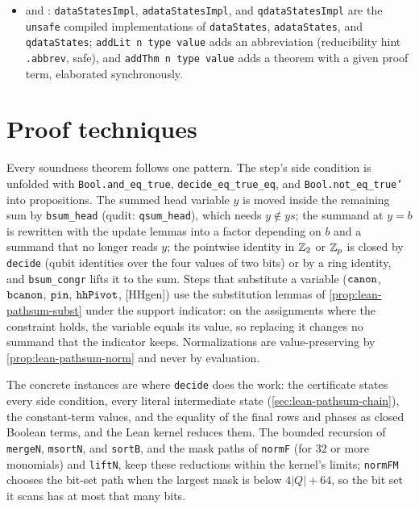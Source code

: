 \begin{itemize}
\item {} and : \textnormal{\texttt{dataStatesImpl}},
  \textnormal{\texttt{adataStatesImpl}}, and \textnormal{\texttt{qdataStatesImpl}} are the \textnormal{\texttt{unsafe}} compiled implementations of
  \textnormal{\texttt{dataStates}}, \textnormal{\texttt{adataStates}}, and \textnormal{\texttt{qdataStates}}; \textnormal{\texttt{addLit n type value}} adds an
  abbreviation (reducibility hint \textnormal{\texttt{.\allowbreak{}abbrev}}, safe), and \textnormal{\texttt{addThm n type value}} adds a
  theorem with a given proof term, elaborated synchronously.
\end{itemize}

\section{Proof techniques}\label{sec:lean-pathsum-proofs}

Every soundness theorem follows one pattern. The step's side condition is unfolded with
\textnormal{\texttt{Bool.\allowbreak{}and\_\allowbreak{}eq\_\allowbreak{}true}}, \textnormal{\texttt{decide\_\allowbreak{}eq\_\allowbreak{}true\_\allowbreak{}eq}}, and \textnormal{\texttt{Bool.\allowbreak{}not\_\allowbreak{}eq\_\allowbreak{}true'}} into propositions.
The summed head variable $y$ is moved inside the remaining sum by \textnormal{\texttt{bsum\_\allowbreak{}head}} (qudit:
\textnormal{\texttt{qsum\_\allowbreak{}head}}), which needs $y\notin ys$; the summand at $y=b$ is rewritten with the update lemmas
into a factor depending on $b$ and a summand that no longer reads $y$; the pointwise identity in
$\mathbb{Z}_{2}$ or $\mathbb{Z}_{p}$ is closed by \textnormal{\texttt{decide}} (qubit identities over the four values of two bits) or
by a ring identity, and \textnormal{\texttt{bsum\_\allowbreak{}congr}} lifts it to the sum. Steps that substitute a variable
($\textnormal{\texttt{canon}}$, $\textnormal{\texttt{bcanon}}$, $\textnormal{\texttt{pin}}$, $\textnormal{\texttt{hhPivot}}$, [HHgen]) use the substitution lemmas
of \cref{prop:lean-pathsum-subst} under the support indicator: on the assignments where the
constraint holds, the variable equals its value, so replacing it changes no summand that the
indicator keeps. Normalizations are value-preserving by \cref{prop:lean-pathsum-norm} and never by
evaluation.

The concrete instances are where \textnormal{\texttt{decide}} does the work: the certificate states every side
condition, every literal intermediate state (\cref{sec:lean-pathsum-chain}), the constant-term
values, and the equality of the final rows and phases as closed Boolean terms, and the Lean
kernel reduces them. The bounded recursion of \textnormal{\texttt{mergeN}}, \textnormal{\texttt{msortN}}, and \textnormal{\texttt{sortB}}, and
the mask paths of \textnormal{\texttt{normF}} (for 32 or more monomials) and \textnormal{\texttt{liftN}}, keep these reductions
within the kernel's limits; \textnormal{\texttt{normFM}} chooses the bit-set path when the largest mask is below
$4|Q|+64$, so the bit set it scans has at most that many bits.

